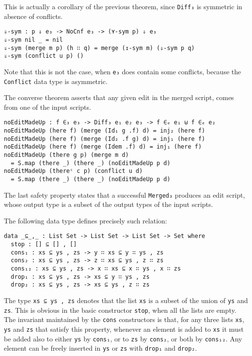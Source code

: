 \documentclass[../Thesis.tex]{subfiles}
\begin{document}
	This is actually a corollary of the previous theorem, since
	\texttt{Diff₃} is symmetric in absence of conflicts.
	
\begin{verbatim}
⇓-sym : p ⇓ e₃ -> NoCnf e₃ -> (⋎-sym p) ⇓ e₃
⇓-sym nil _ = nil
⇓-sym (merge m p) (h ∷ q) = merge (↧-sym m) (⇓-sym p q)
⇓-sym (conflict u p) ()
\end{verbatim}	
	Note that this is not the case, when \texttt{e₃} does contain some conflicts,
	because the \texttt{Conflict} data type is asymmetric.
		
	The converse theorem asserts that any given edit in the merged script,
	comes from one of the input scripts.
	
\begin{verbatim}
noEditMadeUp : f ∈₃ e₃ -> Diff₃ e₁ e₂ e₃ -> f ∈ₑ e₁ ⊎ f ∈ₑ e₂
noEditMadeUp (here f) (merge (Id₁ g .f) d) = inj₂ (here f)
noEditMadeUp (here f) (merge (Id₂ .f g) d) = inj₁ (here f)
noEditMadeUp (here f) (merge (Idem .f) d) = inj₁ (here f)
noEditMadeUp (there g p) (merge m d) 
  = S.map (there _) (there _) (noEditMadeUp p d)
noEditMadeUp (thereᶜ c p) (conflict u d) 
  = S.map (there _) (there _) (noEditMadeUp p d)
\end{verbatim}

	The last safety property states that a successful \texttt{Merged₃}
	produces an edit script, whose output type is a subset of the output
	types of the input scripts.
	
	The following data type defines precisely such relation:

\begin{verbatim}
data _⊆_,_ : List Set -> List Set -> List Set -> Set where
  stop : [] ⊆ [] , []
  cons₁ : xs ⊆ ys , zs -> y ∷ xs ⊆ y ∷ ys , zs
  cons₂ : xs ⊆ ys , zs -> z ∷ xs ⊆ ys , z ∷ zs
  cons₁₂ : xs ⊆ ys , zs -> x ∷ xs ⊆ x ∷ ys , x ∷ zs
  drop₁ : xs ⊆ ys , zs -> xs ⊆ y ∷ ys , zs
  drop₂ : xs ⊆ ys , zs -> xs ⊆ ys , z ∷ zs
\end{verbatim}

	The type \texttt{xs ⊆ ys , zs} denotes that the list \texttt{xs} is a subset
	of the union of \texttt{ys} and \texttt{zs}.
	This is obvious in the basic constructor \texttt{stop}, when all
	the lists are empty.
	The invariant maintained by the \texttt{cons} constructors is that, for any
	three lists \texttt{xs}, \texttt{ys} and \texttt{zs} that satisfy this property,
	 whenever an element is added to \texttt{xs} it must be added also 
	to either \texttt{ys} by \texttt{cons₁}, or  to \texttt{zs} by \texttt{cons₂},
	or both by \texttt{cons₁₂}.
	Any element can be freely inserted in \texttt{ys} or \texttt{zs} with 
	\texttt{drop₁} and \texttt{drop₂}.
	
\end{document}
